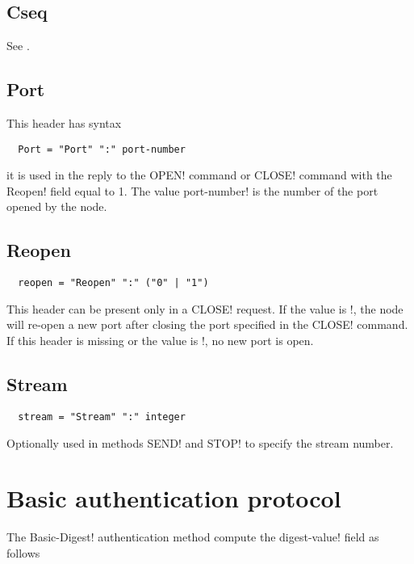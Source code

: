 \documentclass{rfc}
\begin{document}
\subsection{Cseq}
\label{subsub:7.1.2;transport_layer}

See \cite[Section~12.17]{rfc2326}.

\subsection{Port}
\label{sub:7.2;transport_layer}

This header has syntax
%
\begin{verbatim}
  Port = "Port" ":" port-number 
\end{verbatim}
%
it is used in the reply to the \ttt OPEN! command or \ttt CLOSE!
command with the \ttt Reopen! field equal to 1.  The value \ttt
port-number! is the number of the port opened by the node.

\subsection{Reopen}
\label{subsub:7.1.4;transport_layer}

\begin{verbatim}
  reopen = "Reopen" ":" ("0" | "1")
\end{verbatim}
%
This header can be present only in a \ttt CLOSE! request.  If the
value is !, the node will re-open a new port after closing the
port specified in the \ttt CLOSE! command.  If this header is missing
or the value is !, no new port is open.

\subsection{Stream}
\label{subsub:7.1.1;transport_layer}

\begin{verbatim}
  stream = "Stream" ":" integer
\end{verbatim}
%
Optionally used in methods \ttt SEND! and \ttt STOP!  to specify the
stream number.

\section{Basic authentication protocol}
\label{sub:7.3;transport_layer}

The \ttt Basic-Digest! authentication method compute the \ttt
digest-value! field as follows
\end{document}
